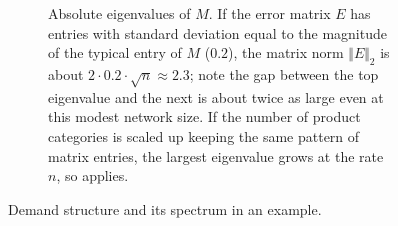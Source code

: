 \documentclass{notices}
\theoremstyle{definition}\newtheorem{problem}{Problem}
\theoremstyle{definition} \newtheorem{remark}{Remark}
\theoremstyle{definition} \newtheorem{claim}{Claim}
\theoremstyle{definition} \newtheorem{thm}{Theorem}
\theoremstyle{definition} \newtheorem*{thmNoNum}{Theorem}
\theoremstyle{definition} \newtheorem{definition}{Definition}
\theoremstyle{definition} \theoremstyle{remark}
\theoremstyle{definition} \newtheorem{note}{Note}
\theoremstyle{definition} \newtheorem{notation}{Notation}
\theoremstyle{definition} \theoremstyle{plain}
\theoremstyle{definition} \newtheorem{condition}{Condition}
\theoremstyle{definition} \newtheorem{lem}{Lemma}
\theoremstyle{definition} \newtheorem{corollary}{Corollary}
\theoremstyle{definition} \newtheorem{prop}{Proposition}
\theoremstyle{definition} \newtheorem{ax}{Axiom}
\theoremstyle{definition} \newtheorem{assumption}{Assumption}
\theoremstyle{definition} \newtheorem{example}{Example}
\theoremstyle{definition} \newtheorem{rmk}{Remark}
\theoremstyle{definition} \newtheorem{res}{Result}
\theoremstyle{definition} \newtheorem{que}{Question}
\theoremstyle{definition} \newtheorem{conjecture}{Conjecture}
\theoremstyle{definition}
\begin{document}
\begin{figure}[ht!]
\begin{subfigure}[t]{0.58\textwidth}

        \caption{Absolute eigenvalues of \(M\). If the error matrix $E$ has entries with standard deviation equal to the magnitude of the typical entry of $M$ ($0.2$), the matrix norm $\Vert E \Vert_2$ is about $2 \cdot 0.2 \cdot \sqrt{n} \approx 2.3$; note the gap between the top eigenvalue and the next is  about twice as large even at this modest network size. If the number of product categories is scaled up keeping the same pattern of matrix entries, the largest eigenvalue grows at the rate $n$, so  applies.}
        \label{fig:spectrum}
    \end{subfigure}
    \caption{Demand structure and its spectrum in an example.}
  \label{fig:sampling_figure}
\end{figure}
\end{document}
